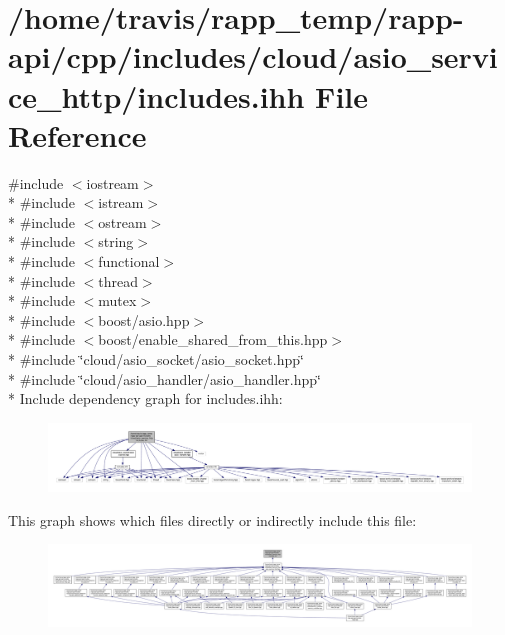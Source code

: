 \hypertarget{cloud_2asio__service__http_2includes_8ihh}{\section{/home/travis/rapp\-\_\-temp/rapp-\/api/cpp/includes/cloud/asio\-\_\-service\-\_\-http/includes.ihh File Reference}
\label{cloud_2asio__service__http_2includes_8ihh}
}
{\ttfamily \#include $<$iostream$>$}\\*
{\ttfamily \#include $<$istream$>$}\\*
{\ttfamily \#include $<$ostream$>$}\\*
{\ttfamily \#include $<$string$>$}\\*
{\ttfamily \#include $<$functional$>$}\\*
{\ttfamily \#include $<$thread$>$}\\*
{\ttfamily \#include $<$mutex$>$}\\*
{\ttfamily \#include $<$boost/asio.\-hpp$>$}\\*
{\ttfamily \#include $<$boost/enable\-\_\-shared\-\_\-from\-\_\-this.\-hpp$>$}\\*
{\ttfamily \#include \char`\"{}cloud/asio\-\_\-socket/asio\-\_\-socket.\-hpp\char`\"{}}\\*
{\ttfamily \#include \char`\"{}cloud/asio\-\_\-handler/asio\-\_\-handler.\-hpp\char`\"{}}\\*
Include dependency graph for includes.\-ihh\-:
\nopagebreak
\begin{figure}[H]
\begin{center}
\leavevmode
\includegraphics[width=350pt]{cloud_2asio__service__http_2includes_8ihh__incl}
\end{center}
\end{figure}
This graph shows which files directly or indirectly include this file\-:
\nopagebreak
\begin{figure}[H]
\begin{center}
\leavevmode
\includegraphics[width=350pt]{cloud_2asio__service__http_2includes_8ihh__dep__incl}
\end{center}
\end{figure}
